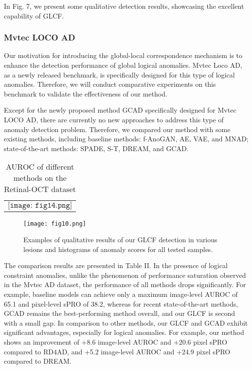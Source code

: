 \documentclass[lettersize,journal]{IEEEtran}
\begin{document}
In Fig. 7, we present some qualitative detection results, showcasing the excellent capability of GLCF.

\subsubsection{\textbf{Mvtec LOCO AD}}

Our motivation for introducing the global-local correspondence mechanism is to enhance the detection performance of global logical anomalies. Mvtec Loco AD, as a newly released benchmark, is specifically designed for this type of logical anomalies. Therefore, we will conduct comparative experiments on this benchmark to validate the effectiveness of our method.


Except for the newly proposed method GCAD\cite{r31} specifically designed for Mvtec LOCO AD, there are currently no new approaches to address this type of anomaly detection problem. Therefore, we compared our method with some existing methods, including baseline methods: f-AnoGAN\cite{r36}, AE\cite{r2}, VAE\cite{r37}, and MNAD\cite{r38}; state-of-the-art methods: SPADE\cite{r21}, S-T\cite{r12}, DREAM\cite{r20}, and GCAD\cite{r31}.
\begin{table}
\caption{AUROC of different methods on the Retinal-OCT dataset}
\label{table}
\setlength{\tabcolsep}{3pt}
\begin{threeparttable}
\begin{tabular}{p{8.8cm}}
$\texttt{[image: fig14.png]}$
\end{tabular}
\end{threeparttable}
\label{table4}
\end{table}

 \begin{figure}[t]\centering
\texttt{[image: fig10.png]}
\caption{Examples of qualitative results of our GLCF detection in various lesions and histograms of anomaly scores for all tested samples.}
\label{FIG0}
\end{figure}
The comparison results are presented in Table II. In the presence of logical constraint anomalies, unlike the phenomenon of performance saturation observed in the Mvtec AD dataset, the performance of all methods drops significantly. For example, baseline models can achieve only a maximum image-level AUROC of 65.1 and pixel-level sPRO of 38.2, whereas for recent state-of-the-art methods, GCAD remains the best-performing method overall, and our GLCF is second with a small gap. In comparison to other methods, our GLCF and GCAD exhibit significant advantages, especially for logical anomalies. For example, our method shows an improvement of +8.6 image-level AUROC and +20.6 pixel sPRO compared to RD4AD, and +5.2 image-level AUROC and +24.9 pixel sPRO compared to DREAM.
\end{document}

